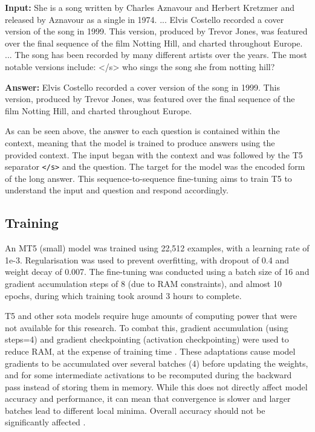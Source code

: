 \begin{itquote}
    \textbf{Input:} She is a song written by Charles Aznavour and Herbert Kretzmer and released by Aznavour as a single in 1974. ... Elvis Costello recorded a cover version of the song in 1999. This version, produced by Trevor Jones, was featured over the final sequence of the film Notting Hill, and charted throughout Europe. ... The song has been recorded by many different artists over the years. The most notable versions include: </s> who sings the song she from notting hill?
    
    \textbf{Answer:} Elvis Costello recorded a cover version of the song in 1999. This version, produced by Trevor Jones, was featured over the final sequence of the film Notting Hill, and charted throughout Europe.
\end{itquote}

As can be seen above, the answer to each question is contained within the context, meaning that the model is trained to produce answers using the provided context. The input began with the context and was followed by the T5 separator \texttt{</s>} and the question. The target for the model was the encoded form of the long answer. This sequence-to-sequence fine-tuning aims to train T5 to understand the input and question and respond accordingly.

\subsection{Training}\label{sec:methodology_qa_training}
An MT5 (small) model was trained using 22,512 examples, with a learning rate of 1e-3. Regularisation was used to prevent overfitting, with dropout of 0.4 and weight decay of 0.007. The fine-tuning was conducted using a batch size of 16 and gradient accumulation steps of 8 (due to RAM constraints), and almost 10 epochs, during which training took around 3 hours to complete. 

T5 and other \acrlong{sota} models require huge amounts of computing power that were not available for this research. To combat this, gradient accumulation (using steps=4) and gradient checkpointing  (activation checkpointing) were used to reduce RAM, at the expense of training time \citep{chen2016training}. These adaptations cause model gradients to be accumulated over several batches (4) before updating the weights, and for some intermediate activations to be recomputed during the backward pass instead of storing them in memory. While this does not directly affect model accuracy and performance, it can mean that convergence is slower and larger batches lead to different local minima. Overall accuracy should not be significantly affected \citep{gradientAccumulation}. 


